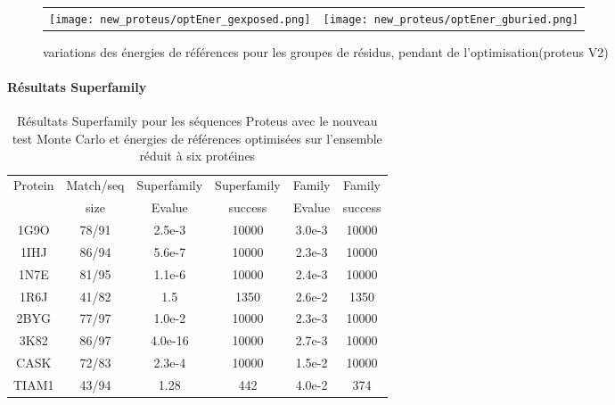    \begin{figure}[t]
     \centering
     \begin{tabular}{cc}
       \texttt{[image: new\_proteus/optEner\_gexposed.png]} &
       \texttt{[image: new\_proteus/optEner\_gburied.png]} \\

     \end{tabular}
     \caption{variations des énergies de références pour les groupes de résidus, pendant de l'optimisation(proteus V2)}
\label{graph:convEref2}
   \end{figure}



    \clearpage
   \paragraph{Résultats Superfamily}


\begin{table}[h]
  \raggedleft{}
  
  \begin{tabular}{cccccc}
    
    \toprule
    Protein & Match/seq & Superfamily & Superfamily & Family & Family \\
            & size      & Evalue      & success     & Evalue & success\\
    \cmidrule{1-6}
    1G9O  & 78/91 & 2.5e-3  & 10000 & 3.0e-3 & 10000 \\
    1IHJ  & 86/94 & 5.6e-7  & 10000 & 2.3e-3 & 10000 \\
    1N7E  & 81/95 & 1.1e-6  & 10000 & 2.4e-3 & 10000 \\
    1R6J  & 41/82 & 1.5     &  1350 & 2.6e-2 &  1350 \\
    2BYG  & 77/97 & 1.0e-2  & 10000 & 2.3e-3 & 10000 \\
    3K82  & 86/97 & 4.0e-16 & 10000 & 2.7e-3 & 10000 \\
    \cmidrule{1-6}
    CASK  & 72/83 & 2.3e-4  & 10000 & 1.5e-2 & 10000 \\
    TIAM1 & 43/94 & 1.28    & 442   & 4.0e-2 & 374 \\
    \bottomrule        
  \end{tabular}   
  \caption{Résultats Superfamily pour les séquences Proteus avec le nouveau test Monte Carlo et énergies de références optimisées sur l'ensemble réduit à six protéines}   
  \label{tab:superfamily_Old_MCtest}       
\end{table}


